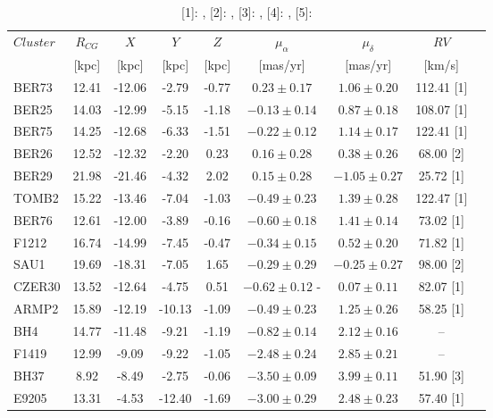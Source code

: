 \documentclass[draft]{aa}
\begin{document}
\begin{appendix}
  \begin{table}
   \caption{[1]: \cite{Tarricq_2021}, [2]: \cite{Dias_2002}, [3]:
   \cite{Soubiran_2018}, [4]: \cite{Dias_2007}, [5]: \cite{Frinchaboy_2006}}
   \label{tab:velocities}
   \centering
   \renewcommand{\arraystretch}{1.3}
   \begin{tabular}{lcccccccc}
    \hline \hline
    $Cluster$ & $R_{CG}$ & $X$ & $Y$ & $Z$ & $\mu_{\alpha}$ & $\mu_{\delta}$ & $RV$\\
     & [kpc] & [kpc] & [kpc] & [kpc] & [mas/yr] & [mas/yr] & [km/s]\\
    \hline
    BER73 & 12.41 & -12.06  & -2.79 & -0.77 & $0.23 \pm 0.17$ & $1.06 \pm 0.20$ & 112.41  [1]\\
    BER25 & 14.03 & -12.99  & -5.15 & -1.18 & $-0.13  \pm 0.14$ & $0.87 \pm 0.18$ & 108.07  [1]\\
    BER75 & 14.25 & -12.68  & -6.33 & -1.51 & $-0.22  \pm 0.12$ & $1.14 \pm 0.17$ & 122.41  [1]\\
    BER26 & 12.52 & -12.32  & -2.20 & 0.23  & $0.16 \pm 0.28$ & $0.38 \pm 0.26$ & 68.00 [2]\\
    BER29 & 21.98 & -21.46  & -4.32 & 2.02  & $0.15 \pm 0.28$ & $-1.05  \pm 0.27$ & 25.72 [1]\\
    TOMB2 & 15.22 & -13.46  & -7.04 & -1.03 & $-0.49  \pm 0.23$ & $1.39 \pm 0.28$ & 122.47  [1]\\
    BER76 & 12.61 & -12.00  & -3.89 & -0.16 & $-0.60  \pm 0.18$ & $1.41 \pm 0.14$ & 73.02 [1]\\
    F1212 & 16.74 & -14.99  & -7.45 & -0.47 & $-0.34  \pm 0.15$ & $0.52 \pm 0.20$ & 71.82 [1]\\
    SAU1  & 19.69 & -18.31  & -7.05 & 1.65  & $-0.29  \pm 0.29$ & $-0.25  \pm 0.27$ & 98.00 [2]\\
    CZER30  & 13.52 & -12.64  & -4.75 & 0.51  & $-0.62  \pm 0.12$ -&  $0.07 \pm 0.11$ & 82.07 [1]\\
    ARMP2 & 15.89 & -12.19  & -10.13  & -1.09 & $-0.49  \pm 0.23$ & $1.25 \pm 0.26$ & 58.25 [1]\\
    BH4 & 14.77 & -11.48  & -9.21 & -1.19 & $-0.82  \pm 0.14$ & $2.12\pm0.16$ & --  \\
    F1419 & 12.99 & -9.09 & -9.22 & -1.05 & $-2.48  \pm 0.24$ & $2.85 \pm 0.21$ & --\\  
    BH37  & 8.92  & -8.49 & -2.75 & -0.06 & $-3.50  \pm 0.09$ & $3.99 \pm 0.11$ & 51.90 [3]\\
    E9205 & 13.31 & -4.53 & -12.40  & -1.69 & $-3.00  \pm 0.29$ & $2.48 \pm 0.23$ & 57.40 [1]\\

\end{tabular}
\end{table}
\end{appendix}
\end{document}
